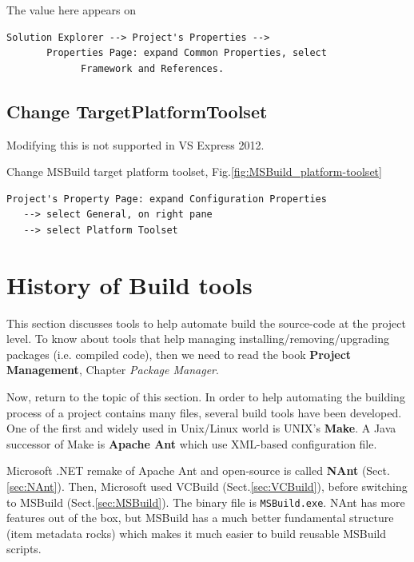 The value here appears on 
\begin{verbatim}
Solution Explorer --> Project's Properties -->
       Properties Page: expand Common Properties, select
             Framework and References.
\end{verbatim}



\subsection{Change TargetPlatformToolset}
\label{sec:change-MSBuild-toolset-version}

Modifying this is not supported in VS Express 2012.

Change MSBuild target platform toolset, Fig.\ref{fig:MSBuild_platform-toolset}

\begin{verbatim}
Project's Property Page: expand Configuration Properties
   --> select General, on right pane
   --> select Platform Toolset
\end{verbatim}

\section{History of Build tools}
\label{sec:history_Build-tools}

This section discusses tools to help automate build the source-code at the
project level. To know about tools that help managing
installing/removing/upgrading packages (i.e. compiled code), then we need to
read the book {\bf Project Management}, Chapter {\it Package Manager}.

Now, return to the topic of this section. In order to help automating the
building process of a project contains many files, several build tools have been
developed. One of the first and widely used in Unix/Linux world is UNIX's {\bf
Make}. A Java successor of Make is {\bf Apache Ant} which use XML-based
configuration file.

Microsoft .NET remake of Apache Ant and open-source is called {\bf NAnt}
(Sect.\ref{sec:NAnt}). Then, Microsoft used VCBuild (Sect.\ref{sec:VCBuild}),
before switching to MSBuild (Sect.\ref{sec:MSBuild}). The binary file is \verb!MSBuild.exe!. 
NAnt has more features out of the box, but MSBuild has a much better fundamental
structure (item metadata rocks) which makes it much easier to build reusable
MSBuild scripts. 

